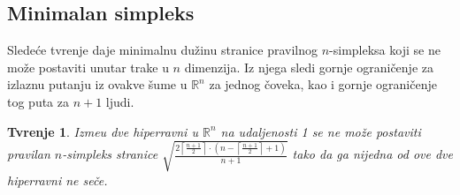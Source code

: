 \documentclass[11pt]{article}
\newtheorem{tvr}[teo]{\bf Tvr\dj enje}
\begin{document}
\smallskip
\subsection[Minimalan simpleks]{Minimalan simpleks}
\bigskip

\indent Slede\' ce tvr\dj enje daje minimalnu du\v zinu stranice pravilnog $n$-simpleksa koji se ne mo\v ze postaviti unutar trake u $n$ dimenzija. Iz njega sledi gornje ograni\v cenje za izlaznu putanju iz ovakve \v sume u $\mathbb{R}^n$ za jednog \v coveka, kao i gornje ograni\v cenje tog puta za $n+1$ ljudi. 
\smallskip

\begin{tvr} Izme\dj u dve hiperravni u $\mathbb{R}^n$ na udaljenosti 1 se ne mo\v ze postaviti pravilan $n$-simpleks stranice $\sqrt{\frac{2\left\lceil \frac{n+1}{2}\right\rceil\cdot \left( n-\left\lceil\frac{n+1}{2}\right\rceil+1\right)}{n+1}}$ tako da ga nijedna od ove dve hiperravni ne se\v ce.
\end{tvr}
\end{document}
